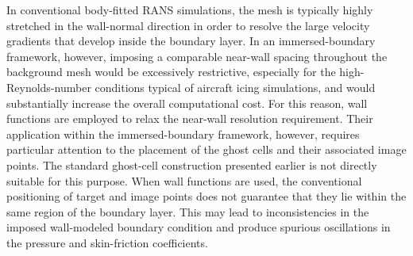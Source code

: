 In conventional body-fitted RANS simulations, the mesh is typically highly stretched in the wall-normal direction in order to resolve the large velocity gradients that develop inside the boundary layer. In an immersed-boundary framework, however, imposing a comparable near-wall spacing throughout the background mesh would be excessively restrictive, especially for the high-Reynolds-number conditions typical of aircraft icing simulations, and would substantially increase the overall computational cost. For this reason, wall functions are employed to relax the near-wall resolution requirement. Their application within the immersed-boundary framework, however, requires particular attention to the placement of the ghost cells and their associated image points. The standard ghost-cell construction presented earlier is not directly suitable for this purpose. When wall functions are used, the conventional positioning of target and image points does not guarantee that they lie within the same region of the boundary layer. This may lead to inconsistencies in the imposed wall-modeled boundary condition and produce spurious oscillations in the pressure and skin-friction coefficients.



